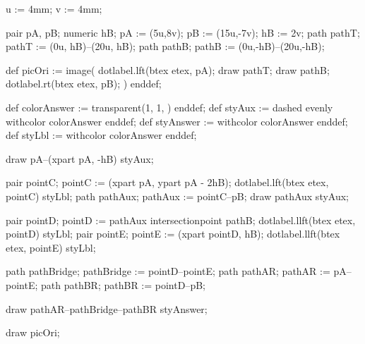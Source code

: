 

u := 4mm;
v := 4mm;

pair pA, pB;
numeric hB;%
pA := (5u,8v);
pB := (15u,-7v);
hB := 2v;
path pathT; %
pathT := (0u, hB)--(20u, hB);
path pathB; %
pathB := (0u,-hB)--(20u,-hB);

def picOri :=
image(
dotlabel.lft(btex  etex, pA);
draw pathT;
draw pathB;
dotlabel.rt(btex  etex, pB);
)
enddef;

def colorAnswer :=
transparent(1, 1, )
enddef;
def styAux :=
dashed evenly withcolor colorAnswer
enddef;
def styAnswer :=
withcolor colorAnswer
enddef;
def styLbl :=
withcolor colorAnswer
enddef;

draw pA--(xpart pA, -hB) styAux;

pair pointC;
pointC := (xpart pA, ypart pA - 2hB);
dotlabel.lft(btex  etex, pointC) styLbl;
path pathAux;
pathAux := pointC--pB;
draw pathAux styAux;

pair pointD;
pointD := pathAux intersectionpoint pathB;
dotlabel.llft(btex  etex, pointD) styLbl;
pair pointE;
pointE := (xpart pointD, hB);
dotlabel.llft(btex  etex, pointE) styLbl;

path pathBridge;
pathBridge := pointD--pointE;
path pathAR;
pathAR := pA--pointE;
path pathBR;
pathBR := pointD--pB;

draw pathAR--pathBridge--pathBR styAnswer;

draw picOri;

\stopreusableMPgraphic
